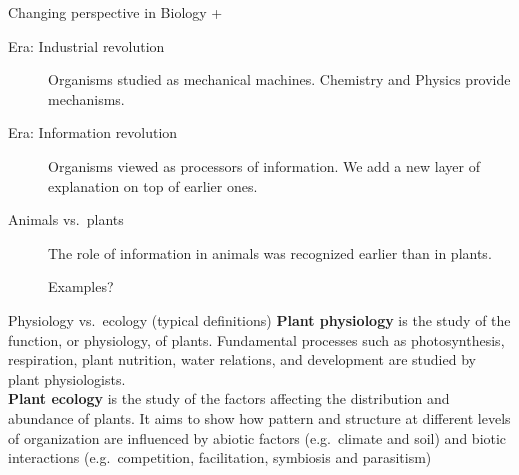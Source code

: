 \documentclass[10pt]{beamer}
\begin{document}
\begin{frame}{Changing perspective in Biology + \Discussion}
  \begin{description}
    \item[Era: Industrial revolution] Organisms studied as mechanical machines. Chemistry and Physics provide mechanisms.
    \item[Era: Information revolution] Organisms viewed as processors of information. We add a new layer of explanation on top of earlier ones.
    \item[Animals vs.\ plants] The role of information in animals was recognized earlier than in plants.
    \item[\DiscussionI] Examples?
  \end{description}
\end{frame}

\begin{frame}{Physiology vs.\ ecology (typical definitions)}
    \textbf{Plant physiology} is the study of the function,
    or physiology, of plants. Fundamental processes such as
    photosynthesis, respiration, plant nutrition, water
    relations, and development are studied by plant physiologists.\\[2ex]

    \textbf{Plant ecology} is the study of the factors affecting the distribution and abundance
    of plants. It aims to show how pattern and structure at
    different levels of organization are influenced by abiotic
    factors (e.g.\ climate and soil) and biotic interactions
    (e.g.\ competition, facilitation, symbiosis and parasitism)
    \\  
\end{frame}
\end{document}
